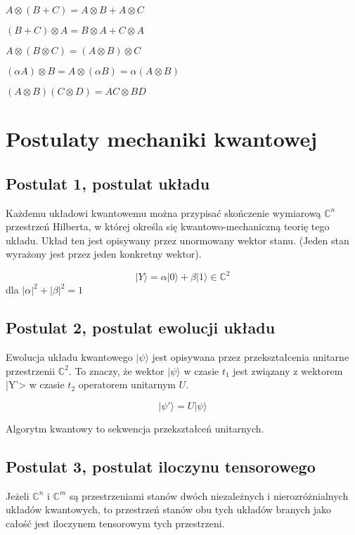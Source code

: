 \documentclass{article}
\newcommand\CC{\mathbb{C}}
\begin{document}
\begin{description}
	\item $ A \otimes (B + C) = A \otimes B + A \otimes C $
	\item $ (B+C) \otimes A = B \otimes A + C \otimes A $
	\item $ A \otimes (B \otimes C) = (A \otimes B) \otimes C $
	\item $ (\alpha A) \otimes B = A \otimes (\alpha B) = \alpha (A \otimes B) $
	\item $ (A \otimes B)(C \otimes D) = AC \otimes BD $
\end{description}

\section{Postulaty mechaniki kwantowej}


	\subsection{Postulat 1, postulat układu}
	Każdemu układowi kwantowemu można przypisać skończenie wymiarową $\CC^n$ przestrzeń Hilberta, w której określa się kwantowo-mechaniczną teorię tego układu. Układ ten jest opisywany przez unormowany wektor stanu. (Jeden stan wyrażony jest przez jeden konkretny wektor).

		$$ |Y\rangle = \alpha |0\rangle + \beta| 1\rangle \in \CC^2 $$ dla $ |\alpha|^2 + |\beta|^2 = 1 $

	\subsection{Postulat 2, postulat ewolucji układu} \label{postulat2}
	Ewolucja układu kwantowego $|\psi\rangle$ jest opisywana przez przekształcenia unitarne przestrzenii $\CC^2$. To znaczy, że wektor $|\psi\rangle$ w czasie $t_1$ jest związany z wektorem |Y'> w czasie $t_2$ operatorem unitarnym $U$.

		$$ |\psi'\rangle = U|\psi\rangle $$

		Algorytm kwantowy to sekwencja przekształceń unitarnych.

	\subsection{Postulat 3, postulat iloczynu tensorowego} Jeżeli $\CC^n$ i $\CC^m$ są przestrzeniami stanów dwóch niezależnych i nierozróżnialnych układów kwantowych, to przestrzeń stanów obu tych układów branych jako całość jest iloczynem tensorowym tych przestrzeni.
\end{document}
